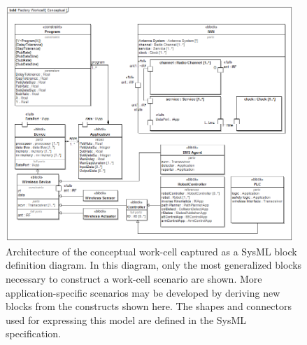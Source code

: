 \begin{figure}
	
	\centering
	\includegraphics[width=0.97\textwidth]{./chapter-sysml/diagrams/bdd__Factory_Workcell__Conceptual}
	\caption{Architecture of the conceptual work-cell captured as a SysML block definition diagram.  In this diagram, only the most generalized blocks necessary to construct a work-cell scenario are shown.  More application-specific scenarios may be developed by deriving new blocks from the constructs shown here. The shapes and connectors used for expressing this model are defined in the SysML specification\cite{SysML2017}. }
	\label{sysml:fig:conceptual:bdd}
	
\end{figure}


